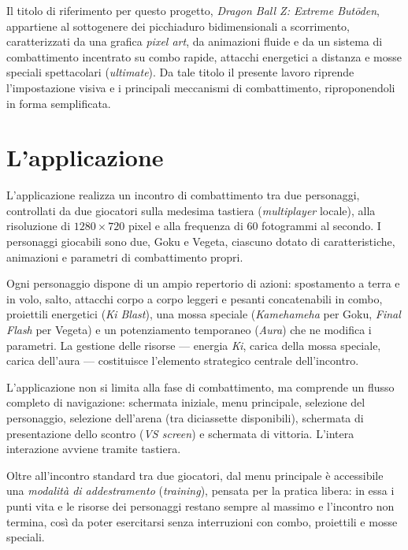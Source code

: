 \documentclass[12pt,a4paper]{report}
\begin{document}
Il titolo di riferimento per questo progetto, \emph{Dragon Ball Z: Extreme Butōden}, appartiene al sottogenere dei picchiaduro bidimensionali a scorrimento, caratterizzati da una grafica \emph{pixel art}, da animazioni fluide e da un sistema di combattimento incentrato su combo rapide, attacchi energetici a distanza e mosse speciali spettacolari (\emph{ultimate}). Da tale titolo il presente lavoro riprende l'impostazione visiva e i principali meccanismi di combattimento, riproponendoli in forma semplificata.



\section{L'applicazione}\label{se:app}
L'applicazione realizza un incontro di combattimento tra due personaggi, controllati da due giocatori sulla medesima tastiera (\emph{multiplayer} locale), alla risoluzione di $1280 \times 720$ pixel e alla frequenza di 60 fotogrammi al secondo. I personaggi giocabili sono due, Goku e Vegeta, ciascuno dotato di caratteristiche, animazioni e parametri di combattimento propri.

Ogni personaggio dispone di un ampio repertorio di azioni: spostamento a terra e in volo, salto, attacchi corpo a corpo leggeri e pesanti concatenabili in combo, proiettili energetici (\emph{Ki Blast}), una mossa speciale (\emph{Kamehameha} per Goku, \emph{Final Flash} per Vegeta) e un potenziamento temporaneo (\emph{Aura}) che ne modifica i parametri. La gestione delle risorse — energia \emph{Ki}, carica della mossa speciale, carica dell'aura — costituisce l'elemento strategico centrale dell'incontro.

L'applicazione non si limita alla fase di combattimento, ma comprende un flusso completo di navigazione: schermata iniziale, menu principale, selezione del personaggio, selezione dell'arena (tra diciassette disponibili), schermata di presentazione dello scontro (\emph{VS screen}) e schermata di vittoria. L'intera interazione avviene tramite tastiera.

Oltre all'incontro standard tra due giocatori, dal menu principale è accessibile una \emph{modalità di addestramento} (\emph{training}), pensata per la pratica libera: in essa i punti vita e le risorse dei personaggi restano sempre al massimo e l'incontro non termina, così da poter esercitarsi senza interruzioni con combo, proiettili e mosse speciali.
\end{document}
